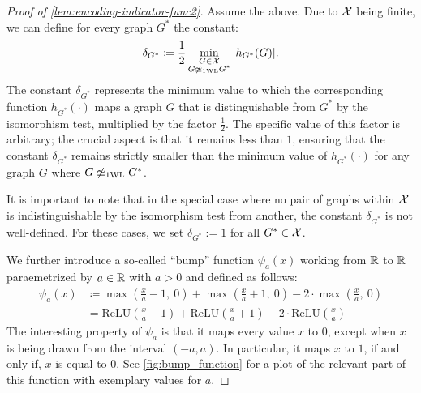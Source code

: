 \begin{proof}[Proof of \cref{lem:encoding-indicator-func2}]
    Assume the above. Due to $\mathcal{X}$ being finite, we can define for every graph $G^*$ the constant:
    \begin{equation*}
        \delta_{G^*} \coloneqq \frac{1}{2} \min_{\substack{G \in \mathcal{X}  \\  G \not\simeq_{\text{1WL}} G^*}} |h_{G^*}(G)|.
    \end{equation*}
    The constant $\delta_{G^*}$ represents the minimum value to which the corresponding function $h_{G^*}(\cdot)$ maps a graph $G$ that is distinguishable from $G^*$ by the \wl isomorphism test, multiplied by the factor $\frac{1}{2}$. The specific value of this factor is arbitrary; the crucial aspect is that it remains less than $1$, ensuring that the constant $\delta_{G^*}$ remains strictly smaller than the minimum value of $h_{G^*}(\cdot)$ for any graph $G$ where $G\not \simeq_{\text{1WL}} G^*$.

    It is important to note that in the special case where no pair of graphs within $\mathcal{X}$ is indistinguishable by the \wl isomorphism test from another, the constant $\delta_{G^*}$ is not well-defined. For these cases, we set $\delta_{G^*} := 1$ for all $G^* \in \mathcal{X}$.

    We further introduce a so-called ``bump'' function $\psi_a(x)$ working from $\mathbb{R}$ to $\mathbb{R}$ paraemetrized by $a \in \mathbb{R}$ with $a > 0$ and defined as follows:
    \begin{align}\label{eq:lemma_encoding_indicator_func2}
        \psi_a(x) &\coloneqq \max(\frac{x}{a} -1,\ 0) + \max(\frac{x}{a}+1, \ 0) - 2 \cdot \max(\frac{x}{a}, \ 0) \nonumber\\
        &= \text{ReLU}(\frac{x}{a} -1) + \text{ReLU}(\frac{x}{a}+1) - 2 \cdot \text{ReLU}(\frac{x}{a})
    \end{align}
    The interesting property of $\psi_a$ is that it maps every value $x$ to $0$, except when $x$ is being drawn from the interval $(-a, a)$. In particular, it maps $x$ to $1$, if and only if, $x$ is equal to $0$. See \cref{fig:bump_function} for a plot of the relevant part of this function with exemplary values for $a$.


\end{proof}
